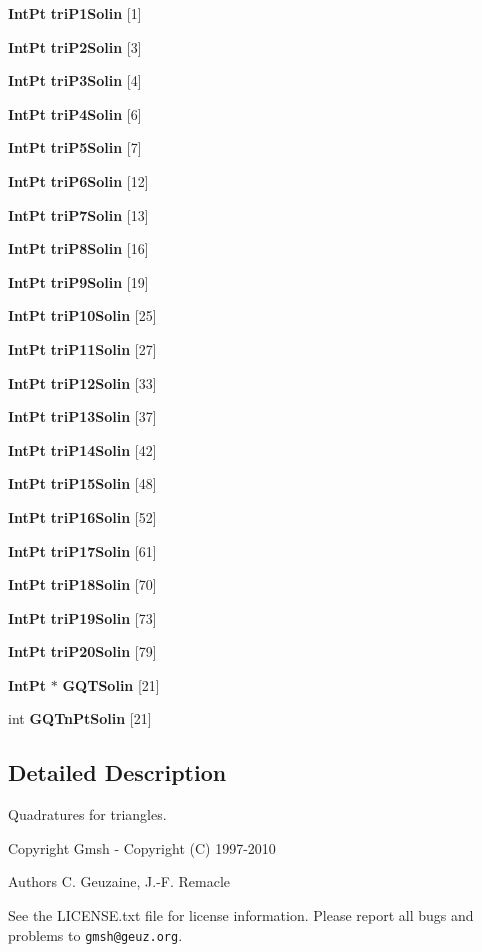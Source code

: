 \begin{DoxyCompactItemize}
\item 
{\bf Int\-Pt} {\bf tri\-P1\-Solin} [1]
\item 
{\bf Int\-Pt} {\bf tri\-P2\-Solin} [3]
\item 
{\bf Int\-Pt} {\bf tri\-P3\-Solin} [4]
\item 
{\bf Int\-Pt} {\bf tri\-P4\-Solin} [6]
\item 
{\bf Int\-Pt} {\bf tri\-P5\-Solin} [7]
\item 
{\bf Int\-Pt} {\bf tri\-P6\-Solin} [12]
\item 
{\bf Int\-Pt} {\bf tri\-P7\-Solin} [13]
\item 
{\bf Int\-Pt} {\bf tri\-P8\-Solin} [16]
\item 
{\bf Int\-Pt} {\bf tri\-P9\-Solin} [19]
\item 
{\bf Int\-Pt} {\bf tri\-P10\-Solin} [25]
\item 
{\bf Int\-Pt} {\bf tri\-P11\-Solin} [27]
\item 
{\bf Int\-Pt} {\bf tri\-P12\-Solin} [33]
\item 
{\bf Int\-Pt} {\bf tri\-P13\-Solin} [37]
\item 
{\bf Int\-Pt} {\bf tri\-P14\-Solin} [42]
\item 
{\bf Int\-Pt} {\bf tri\-P15\-Solin} [48]
\item 
{\bf Int\-Pt} {\bf tri\-P16\-Solin} [52]
\item 
{\bf Int\-Pt} {\bf tri\-P17\-Solin} [61]
\item 
{\bf Int\-Pt} {\bf tri\-P18\-Solin} [70]
\item 
{\bf Int\-Pt} {\bf tri\-P19\-Solin} [73]
\item 
{\bf Int\-Pt} {\bf tri\-P20\-Solin} [79]
\item 
{\bf Int\-Pt} $\ast$ {\bfseries G\-Q\-T\-Solin} [21]
\item 
int {\bfseries G\-Q\-Tn\-Pt\-Solin} [21]
\end{DoxyCompactItemize}


\subsection{Detailed Description}
Quadratures for triangles. \begin{DoxyCopyright}{Copyright}
Gmsh -\/ Copyright (C) 1997-\/2010 
\end{DoxyCopyright}
\begin{DoxyAuthor}{Authors}
C. Geuzaine, J.-\/\-F. Remacle
\end{DoxyAuthor}
See the L\-I\-C\-E\-N\-S\-E.\-txt file for license information. Please report all bugs and problems to {\tt gmsh@geuz.\-org}. 

